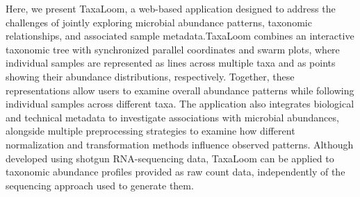 \documentclass[pdflatex,sn-vancouver-num]{sn-jnl}%
\theoremstyle{thmstyleone}%
\theoremstyle{thmstyletwo}%
\theoremstyle{thmstylethree}%
\begin{document}
Here, we present TaxaLoom, a web-based application designed to address the challenges of jointly exploring microbial abundance patterns, taxonomic relationships, and associated sample metadata.TaxaLoom combines an interactive taxonomic tree with synchronized parallel coordinates and swarm plots, where individual samples are represented as lines across multiple taxa and as points showing their abundance distributions, respectively. Together, these representations allow users to examine overall abundance patterns while following individual samples across different taxa. The application also integrates biological and technical metadata to investigate associations with microbial abundances, alongside multiple preprocessing strategies to examine how different normalization and transformation methods influence observed patterns. Although developed using shotgun RNA-sequencing data, TaxaLoom can be applied to taxonomic abundance profiles provided as raw count data, independently of the sequencing approach used to generate them.





\newcommand{\fixedrow}{\rule[-0.45cm]{0pt}{0.8cm}}
\end{document}
